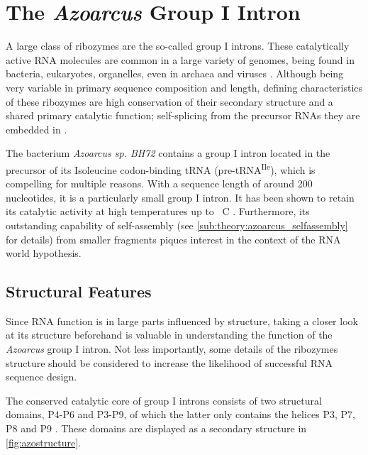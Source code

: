 \documentclass[../../master.tex]{subfiles}
\begin{document}
\section{The \textit{Azoarcus} Group I Intron}
\label{sec:theory:gii}

A large class of ribozymes are the so-called group I introns. 
These catalytically active RNA molecules are common in a large variety of genomes, being found in bacteria, eukaryotes, organelles, even in archaea and viruses \parencite{zhou_gissd_2008, nawrocki_group_2018}.
Although being very variable in primary sequence composition and length, defining characteristics of these ribozymes are high conservation of their secondary structure and a shared primary catalytic function; self-splicing from the precursor RNAs they are embedded in \parencite{zhou_gissd_2008}.


The bacterium \textit{Azoarcus sp. BH72} contains a group I intron located in the precursor of its Isoleucine codon-binding tRNA (pre-tRNA\textsuperscript{Ile}), which is compelling for multiple reasons.
With a sequence length of around 200 nucleotides, it is a particularly small group I intron. 
It has been shown to retain its catalytic activity at high temperatures up to \unit[80]{\textdegree C} \parencite{tanner_activity_1996}.
Furthermore, its outstanding capability of self-assembly (see \autoref{sub:theory:azoarcus_selfassembly} for details) from smaller fragments piques interest in the context of the RNA world hypothesis. 

\subsection{Structural Features}
\label{sub:theory:azoarcus_structurefeatures}

Since RNA function is in large parts influenced by structure, taking a closer look at its structure beforehand is valuable in understanding the function of the \textit{Azoarcus} group I intron.
Not less importantly, some details of the ribozymes structure should be considered to increase the likelihood of successful RNA sequence design.

The conserved catalytic core of group I introns consists of two structural domains, P4-P6 and P3-P9, of which the latter only contains the helices P3, P7, P8 and P9 \parencite{tanner_joining_1997}. 
These domains are displayed as a secondary structure in \autoref{fig:azostructure}.
\end{document}
